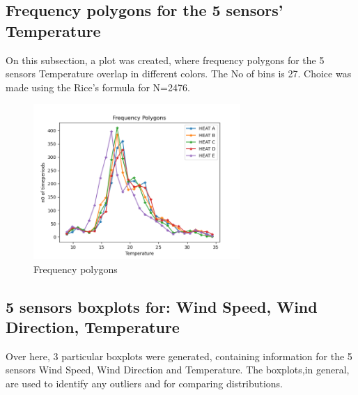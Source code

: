\documentclass[a4paper,12pt]{article} %
\begin{document}
\subsection{Frequency polygons for the 5 sensors' Temperature}
\vspace{5mm}
On this subsection, a plot was created, where frequency polygons for the 5 sensors Temperature overlap in different colors. The No of bins is 27. Choice was made using the Rice's formula for N=2476.
 \begin{figure}[H]   
	\centering 
	\includegraphics[width=0.7\textwidth]{Figure_3.png}
	\caption{Frequency polygons} 
\end{figure}
\vspace{10mm}
\subsection{5 sensors boxplots for: Wind Speed, Wind Direction, Temperature}
\vspace{5mm}
Over here, 3 particular boxplots were generated, containing information for the 5 sensors Wind Speed, Wind Direction and Temperature. The boxplots,in general, are used to identify any outliers and for comparing distributions.
\end{document}
